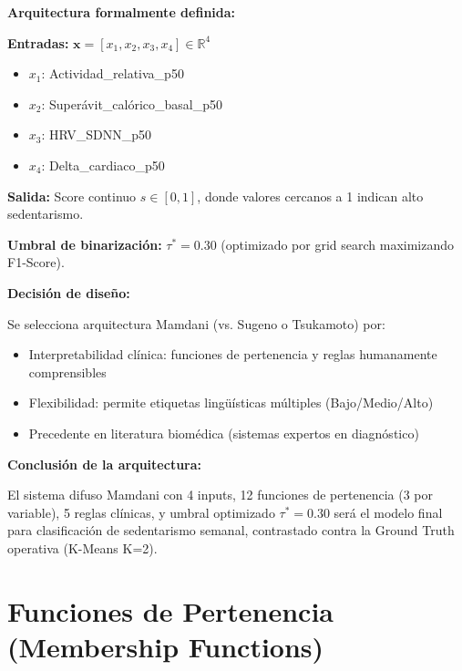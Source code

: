 \documentclass[12pt,letterpaper,twoside]{report}
\newcommand{\vect}[1]{\boldsymbol{#1}}
\begin{document}
\begin{calculobox}
\textbf{Arquitectura formalmente definida:}

\textbf{Entradas:} $\vect{x} = [x_1, x_2, x_3, x_4] \in \mathbb{R}^4$
\begin{itemize}[noitemsep]
    \item $x_1$: Actividad\_relativa\_p50
    \item $x_2$: Superávit\_calórico\_basal\_p50
    \item $x_3$: HRV\_SDNN\_p50
    \item $x_4$: Delta\_cardiaco\_p50
\end{itemize}

\textbf{Salida:} Score continuo $s \in [0,1]$, donde valores cercanos a 1 indican alto sedentarismo.

\textbf{Umbral de binarización:} $\tau^* = 0.30$ (optimizado por grid search maximizando F1-Score).
\end{calculobox}

\begin{decisionbox}
\textbf{Decisión de diseño:}

Se selecciona arquitectura Mamdani (vs. Sugeno o Tsukamoto) por:
\begin{itemize}[noitemsep]
    \item Interpretabilidad clínica: funciones de pertenencia y reglas humanamente comprensibles
    \item Flexibilidad: permite etiquetas lingüísticas múltiples (Bajo/Medio/Alto)
    \item Precedente en literatura biomédica (sistemas expertos en diagnóstico)
\end{itemize}
\end{decisionbox}

\begin{conclusionbox}
\textbf{Conclusión de la arquitectura:}

El sistema difuso Mamdani con 4 inputs, 12 funciones de pertenencia (3 por variable), 5 reglas clínicas, y umbral optimizado $\tau^* = 0.30$ será el modelo final para clasificación de sedentarismo semanal, contrastado contra la Ground Truth operativa (K-Means K=2).
\end{conclusionbox}

\section{Funciones de Pertenencia (Membership Functions)}
\end{document}
